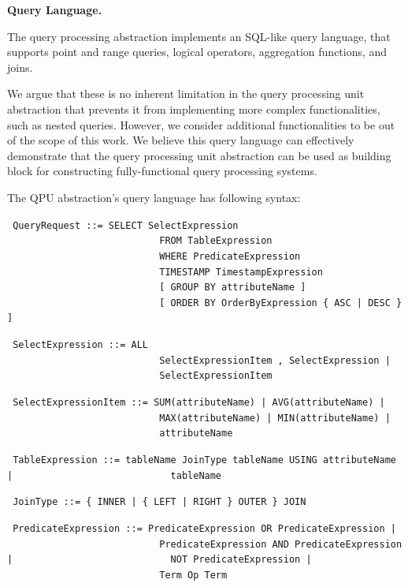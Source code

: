 \bigskip

\textbf{Query Language.}

The query processing abstraction implements an SQL-like query language,
that supports point and range queries, logical operators, aggregation functions, and joins.

We argue that these is no inherent limitation in the query processing unit abstraction that prevents it from implementing
more complex functionalities, such as nested queries.
However, we consider additional functionalities to be out of the scope of this work.
We believe this query language can effectively demonstrate that the query processing unit abstraction can be used as building
block for constructing fully-functional query processing systems.

The QPU abstraction's query language has following syntax:

{\obeylines\obeyspaces
\texttt{
QueryRequest          ::=  SELECT SelectExpression
~~~~~~~~~~~~~~~~~~~~~~~~~~~FROM TableExpression
~~~~~~~~~~~~~~~~~~~~~~~~~~~WHERE PredicateExpression
~~~~~~~~~~~~~~~~~~~~~~~~~~~TIMESTAMP TimestampExpression 
~~~~~~~~~~~~~~~~~~~~~~~~~~~[ GROUP BY attributeName ]
~~~~~~~~~~~~~~~~~~~~~~~~~~~[ ORDER BY OrderByExpression \{ ASC | DESC \} ]
}}

{\obeylines\obeyspaces
\texttt{
SelectExpression      ::=  ALL
~~~~~~~~~~~~~~~~~~~~~~~~~~~SelectExpressionItem , SelectExpression |
~~~~~~~~~~~~~~~~~~~~~~~~~~~SelectExpressionItem
}}

{\obeylines\obeyspaces
\texttt{
SelectExpressionItem  ::=  SUM(attributeName) | AVG(attributeName) |
~~~~~~~~~~~~~~~~~~~~~~~~~~~MAX(attributeName) | MIN(attributeName) |
~~~~~~~~~~~~~~~~~~~~~~~~~~~attributeName
}}

{\obeylines\obeyspaces
\texttt{
TableExpression       ::=  tableName JoinType tableName USING attributeName |
~~~~~~~~~~~~~~~~~~~~~~~~~~~tableName
}}

{\obeylines\obeyspaces
\texttt{
JoinType              ::=  \{ INNER | \{ LEFT | RIGHT \} OUTER \} JOIN
}}

{\obeylines\obeyspaces
\texttt{
PredicateExpression   ::=  PredicateExpression OR PredicateExpression |
~~~~~~~~~~~~~~~~~~~~~~~~~~~PredicateExpression AND PredicateExpression |
~~~~~~~~~~~~~~~~~~~~~~~~~~~NOT PredicateExpression |
~~~~~~~~~~~~~~~~~~~~~~~~~~~Term Op Term
}}

